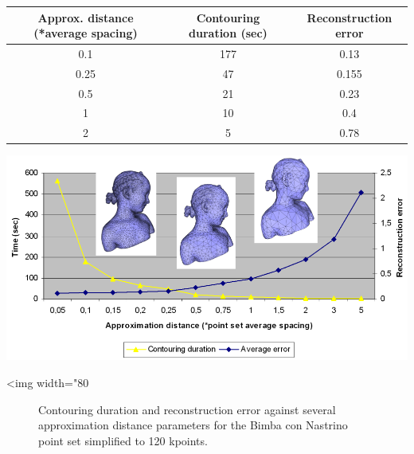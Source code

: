\begin{tabular}{|c|c|c|}
  \hline
  Approx. distance (*average spacing)    & Contouring duration (sec) & Reconstruction error \\
  \hline
  0.1                                    & 177                       & 0.13 \\
  0.25                                   & 47                        & 0.155 \\
  0.5                                    & 21                        & 0.23 \\
  1                                      & 10                        & 0.4 \\
  2                                      & 5                         & 0.78 \\
  \hline
\end{tabular}

\begin{center}
    \label{Surface_reconstruction_points_3-fig-contouring_bench}
    \begin{ccTexOnly}
      \includegraphics[width=1.0\textwidth]{Surface_reconstruction_points_3/contouring_bench}
    \end{ccTexOnly}
    \begin{ccHtmlOnly}
        <img width="80%
    \end{ccHtmlOnly}
    \begin{figure}[h]
        \caption{Contouring duration and reconstruction error
                 against several approximation distance parameters
                 for the Bimba con Nastrino point set simplified to 120 kpoints.}
    \end{figure}
\end{center}



